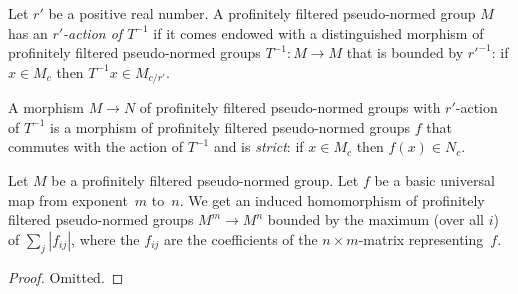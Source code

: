 \begin{definition}
  \label{profinitely_filtered_pseudo_normed_group_with_Tinv}
  \leanok
  Let $r'$ be a positive real number.
  A profinitely filtered pseudo-normed group $M$
  has an \emph{$r'$-action of $T^{-1}$}
  if it comes endowed with a distinguished morphism
  of profinitely filtered pseudo-normed groups
  $T^{-1} \colon M \to M$
  that is bounded by $r'^{-1}$:
  if $x \in M_c$ then $T^{-1}x \in M_{c/r'}$.

  A morphism $M \to N$
  of profinitely filtered pseudo-normed groups with $r'$-action of $T^{-1}$
  is a morphism of profinitely filtered pseudo-normed groups $f$
  that commutes with the action of $T^{-1}$
  and is \emph{strict}: if $x \in M_c$ then $f(x) \in N_c$.
\end{definition}

\begin{lemma}
  \label{basic_eval_FP}
  \leanok
  Let $M$ be a profinitely filtered pseudo-normed group.
  Let $f$ be a basic universal map from exponent~$m$ to~$n$.
  We get an induced homomorphism of
  profinitely filtered pseudo-normed groups $M^m \to M^n$
  bounded by the maximum (over all $i$) of $\sum_j |f_{ij}|$,
  where the $f_{ij}$ are the coefficients of the $n \times m$-matrix representing~$f$.
\end{lemma}

\begin{proof}
  \leanok
  Omitted.
\end{proof}

